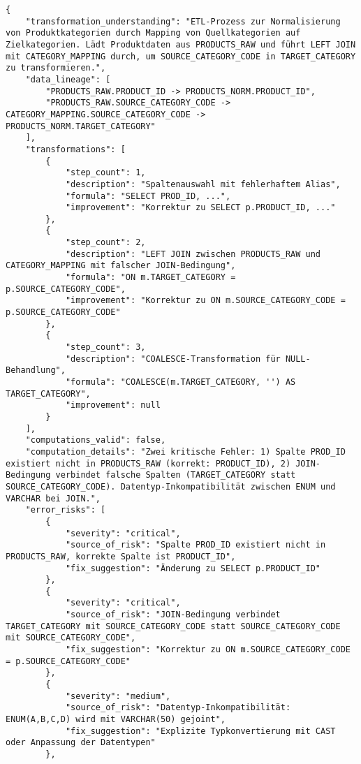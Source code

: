 \begin{lstlisting}[caption={Ausgabe: Claude Sonnet 4 Anwendungsfall 6 Konsistenzdurchlauf},label={claude_case6_prompt2}]
{
    "transformation_understanding": "ETL-Prozess zur Normalisierung von Produktkategorien durch Mapping von Quellkategorien auf Zielkategorien. Lädt Produktdaten aus PRODUCTS_RAW und führt LEFT JOIN mit CATEGORY_MAPPING durch, um SOURCE_CATEGORY_CODE in TARGET_CATEGORY zu transformieren.",
    "data_lineage": [
        "PRODUCTS_RAW.PRODUCT_ID -> PRODUCTS_NORM.PRODUCT_ID",
        "PRODUCTS_RAW.SOURCE_CATEGORY_CODE -> CATEGORY_MAPPING.SOURCE_CATEGORY_CODE -> PRODUCTS_NORM.TARGET_CATEGORY"
    ],
    "transformations": [
        {
            "step_count": 1,
            "description": "Spaltenauswahl mit fehlerhaftem Alias",
            "formula": "SELECT PROD_ID, ...",
            "improvement": "Korrektur zu SELECT p.PRODUCT_ID, ..."
        },
        {
            "step_count": 2,
            "description": "LEFT JOIN zwischen PRODUCTS_RAW und CATEGORY_MAPPING mit falscher JOIN-Bedingung",
            "formula": "ON m.TARGET_CATEGORY = p.SOURCE_CATEGORY_CODE",
            "improvement": "Korrektur zu ON m.SOURCE_CATEGORY_CODE = p.SOURCE_CATEGORY_CODE"
        },
        {
            "step_count": 3,
            "description": "COALESCE-Transformation für NULL-Behandlung",
            "formula": "COALESCE(m.TARGET_CATEGORY, '') AS TARGET_CATEGORY",
            "improvement": null
        }
    ],
    "computations_valid": false,
    "computation_details": "Zwei kritische Fehler: 1) Spalte PROD_ID existiert nicht in PRODUCTS_RAW (korrekt: PRODUCT_ID), 2) JOIN-Bedingung verbindet falsche Spalten (TARGET_CATEGORY statt SOURCE_CATEGORY_CODE). Datentyp-Inkompatibilität zwischen ENUM und VARCHAR bei JOIN.",
    "error_risks": [
        {
            "severity": "critical",
            "source_of_risk": "Spalte PROD_ID existiert nicht in PRODUCTS_RAW, korrekte Spalte ist PRODUCT_ID",
            "fix_suggestion": "Änderung zu SELECT p.PRODUCT_ID"
        },
        {
            "severity": "critical",
            "source_of_risk": "JOIN-Bedingung verbindet TARGET_CATEGORY mit SOURCE_CATEGORY_CODE statt SOURCE_CATEGORY_CODE mit SOURCE_CATEGORY_CODE",
            "fix_suggestion": "Korrektur zu ON m.SOURCE_CATEGORY_CODE = p.SOURCE_CATEGORY_CODE"
        },
        {
            "severity": "medium",
            "source_of_risk": "Datentyp-Inkompatibilität: ENUM(A,B,C,D) wird mit VARCHAR(50) gejoint",
            "fix_suggestion": "Explizite Typkonvertierung mit CAST oder Anpassung der Datentypen"
        },

\end{lstlisting}
